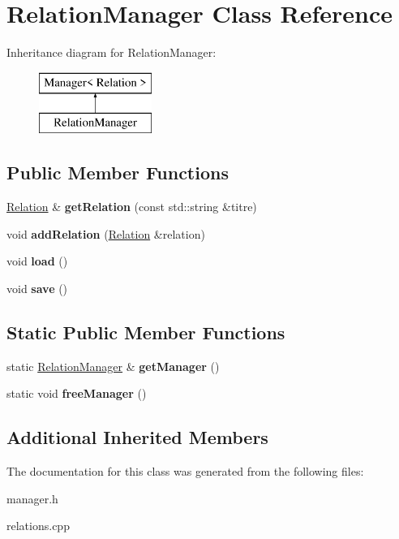 \hypertarget{class_relation_manager}{}\section{Relation\+Manager Class Reference}
\label{class_relation_manager}
Inheritance diagram for Relation\+Manager\+:\begin{figure}[H]
\begin{center}
\leavevmode
\includegraphics[height=2.000000cm]{class_relation_manager}
\end{center}
\end{figure}
\subsection*{Public Member Functions}
\begin{DoxyCompactItemize}
\item 
\mbox{\label{class_relation_manager_a7e5900e270c2249831355c70b2fd94b8}} 
\hyperlink{class_relation}{Relation} \& {\bfseries get\+Relation} (const std\+::string \&titre)
\item 
\mbox{\label{class_relation_manager_a2933861a9b973a35031e799ef9d369b5}} 
void {\bfseries add\+Relation} (\hyperlink{class_relation}{Relation} \&relation)
\item 
\mbox{\label{class_relation_manager_a593a538680d22c21a8d1a8dd981f6b44}} 
void {\bfseries load} ()
\item 
\mbox{\label{class_relation_manager_ac9b805487819264d8ef7faab68521822}} 
void {\bfseries save} ()
\end{DoxyCompactItemize}
\subsection*{Static Public Member Functions}
\begin{DoxyCompactItemize}
\item 
\mbox{\label{class_relation_manager_a525665dcd2599872667dd32f36506f41}} 
static \hyperlink{class_relation_manager}{Relation\+Manager} \& {\bfseries get\+Manager} ()
\item 
\mbox{\label{class_relation_manager_a4c967c4473a2bd29ab558ebf74aed149}} 
static void {\bfseries free\+Manager} ()
\end{DoxyCompactItemize}
\subsection*{Additional Inherited Members}


The documentation for this class was generated from the following files\+:\begin{DoxyCompactItemize}
\item 
manager.\+h\item 
relations.\+cpp\end{DoxyCompactItemize}
